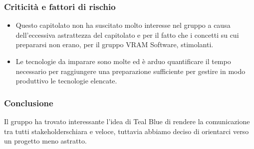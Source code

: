 \subsubsection{Criticità e fattori di rischio}
\begin{itemize}
	\item Questo capitolato non ha suscitato molto interesse nel gruppo a causa dell'eccessiva astrattezza del capitolato e per il fatto che i concetti su cui prepararsi non erano, per il gruppo VRAM Software, stimolanti. 
	\item Le tecnologie da imparare sono molte ed è arduo quantificare il tempo necessario per raggiungere una preparazione sufficiente per gestire in modo produttivo le tecnologie elencate.
\end{itemize}
\subsubsection{Conclusione}
Il gruppo ha trovato interessante l'idea di Teal Blue di rendere la comunicazione tra tutti stakeholders\glo chiara e veloce, tuttavia abbiamo deciso di orientarci verso un progetto meno astratto.